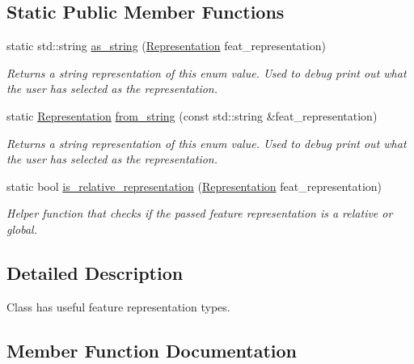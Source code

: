 \subsection*{Static Public Member Functions}
\begin{DoxyCompactItemize}
\item 
static std\+::string \hyperlink{classov__type_1_1LandmarkRepresentation_ab20d64d87c0d661cd343cdd7814d8264}{as\+\_\+string} (\hyperlink{classov__type_1_1LandmarkRepresentation_a7f5783df6932ace7f098ae243b6d298e}{Representation} feat\+\_\+representation)
\begin{DoxyCompactList}\small\item\em Returns a string representation of this enum value. Used to debug print out what the user has selected as the representation. \end{DoxyCompactList}\item 
static \hyperlink{classov__type_1_1LandmarkRepresentation_a7f5783df6932ace7f098ae243b6d298e}{Representation} \hyperlink{classov__type_1_1LandmarkRepresentation_a730830f7d0235f40f4266d0a66895e50}{from\+\_\+string} (const std\+::string \&feat\+\_\+representation)
\begin{DoxyCompactList}\small\item\em Returns a string representation of this enum value. Used to debug print out what the user has selected as the representation. \end{DoxyCompactList}\item 
static bool \hyperlink{classov__type_1_1LandmarkRepresentation_a67860ca8360c71fa8c1ae3f99a2378c1}{is\+\_\+relative\+\_\+representation} (\hyperlink{classov__type_1_1LandmarkRepresentation_a7f5783df6932ace7f098ae243b6d298e}{Representation} feat\+\_\+representation)
\begin{DoxyCompactList}\small\item\em Helper function that checks if the passed feature representation is a relative or global. \end{DoxyCompactList}\end{DoxyCompactItemize}


\subsection{Detailed Description}
Class has useful feature representation types. 

\subsection{Member Function Documentation}
\mbox{\label{classov__type_1_1LandmarkRepresentation_ab20d64d87c0d661cd343cdd7814d8264}} 
